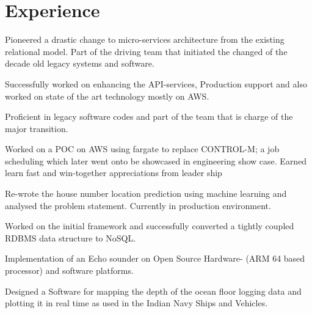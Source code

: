 \documentclass[]{deedy-resume-openfont}
\begin{document}
\hfill
\begin{minipage}[t]{0.66\textwidth} 


\section{Experience}


\vspace{\topsep} %
\begin{tightemize}\item Pioneered a drastic change to micro-services architecture from the existing relational model. Part of the driving team that initiated the changed of the decade old legacy systems and software.
\item Successfully worked on enhancing the API-services, Production support and also worked on state of the art technology mostly on AWS.
\item Proficient in legacy software codes and part of the team that is charge of the major transition. 
\end{tightemize}

\begin{tightemize}\item Worked on a POC on AWS using fargate to replace CONTROL-M; a job scheduling which later went onto be showcased in engineering show case. Earned learn fast and win-together appreciations from leader ship
\item Re-wrote the house number location prediction using machine learning and analysed the problem statement. Currently in production environment.
\item Worked on the initial framework and successfully converted a tightly coupled RDBMS data structure to NoSQL.
\end{tightemize}
\sectionsep

\sectionsep


\begin{tightemize}\item Implementation of an Echo sounder on Open Source Hardware- (ARM 64 based processor) and software platforms.
\item Designed a Software for mapping the depth of the ocean floor logging data and plotting it in real time as used in the Indian Navy Ships and Vehicles.
\end{tightemize}
\sectionsep


\end{minipage}
\end{document}
